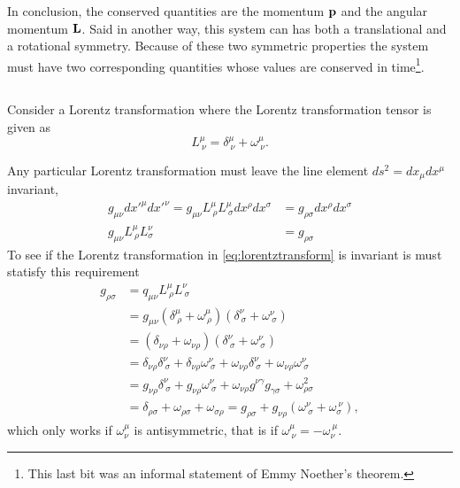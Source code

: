 \documentclass[11pt]{amsart}
\begin{document}
In conclusion, the conserved quantities are the momentum $\vb{p}$ and the angular momentum $\vb{L}$. Said in another way, this system can has both a translational and a rotational symmetry. Because of these two symmetric properties the system must have two corresponding quantities whose values are conserved in time\footnote{This last bit was an informal statement of Emmy Noether's theorem.}.

\subsection{}

\subsection{}

\subsection{}
Consider a Lorentz transformation where the Lorentz transformation tensor is given as
\begin{equation}
\label{eq:lorentztransform}
L^\mu_{\ \nu} = \delta^{\mu}_{\ \nu} + \omega^{\mu}_{\ \nu}.
\end{equation}

Any particular Lorentz transformation must leave the line element $ds^2 = dx_{\mu}dx^{\mu}$ invariant,
\begin{align*}
g_{\mu\nu}dx'^{\mu}dx'^{\nu} = g_{\mu\nu} L^\mu_{\ \rho} L^\mu_{\ \sigma}dx^\rho dx^\sigma 
											&= g_{\rho\sigma}dx^\rho dx^\sigma \\
g_{\mu\nu}L^{\mu}_{\ \rho}L^{\nu}_{\sigma}	&= g_{\rho\sigma}
\end{align*}
To see if the Lorentz transformation in \ref{eq:lorentztransform} is invariant is must statisfy this requirement
\begin{align*}
g_{\rho\sigma}  &= q_{\mu\nu}L^{\mu}_{\ \rho}L^{\nu}_{\ \sigma} \\
			&= g_{\mu\nu}(\delta^{\mu}_{\ \rho} + \omega^{\mu}_{\ \rho})(\delta^{\nu}_{\ \sigma} + \omega^{\nu}_{\ \sigma}) \\
			&= (\delta_{\nu\rho} + \omega_{\nu\rho})(\delta^{\nu}_{\ \sigma} + \omega^{\nu}_{\ \sigma}) \\
			&= \delta_{\nu\rho}\delta^{\nu}_{\ \sigma} + \delta_{\nu\rho}\omega^{\nu}_{\ \sigma} + \omega_{\nu\rho}\delta^{\nu}_{\ \sigma} + \omega_{\nu\rho}\omega^{\nu}_{\ \sigma} \\
			&= g_{\nu\rho}\delta^{\nu}_{\ \sigma} + g_{\nu\rho}\omega^{\nu}_{\ \sigma} + \omega_{\nu\rho}g^{\nu\gamma} g_{\gamma\sigma} + \omega^2_{\rho\sigma} \\
			& = \delta_{\rho\sigma} + \omega_{\rho\sigma} + \omega_{\sigma\rho} = g_{\rho\sigma} + g_{\nu\rho}(\omega^{\nu}_{\ \sigma} + \omega_{\sigma}^{\ \nu}),
\end{align*}
which only works if $\omega^{\mu}_{\nu}$ is antisymmetric, that is if $\omega^{\mu}_{\ \nu} = -\omega_{\nu}^{\ \mu}$.
\end{document}
